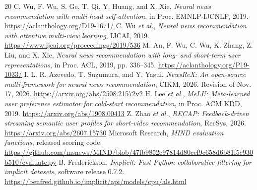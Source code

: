 \documentclass[11pt,onecolumn,conference,letterpaper]{IEEEtran}
\begin{document}
\begin{thebibliography}{20}
 C. Wu, F. Wu, S. Ge, T. Qi, Y. Huang, and X. Xie, \emph{Neural news recommendation with multi-head self-attention}, in Proc. EMNLP-IJCNLP, 2019. \url{https://aclanthology.org/D19-1671/}
 C. Wu \emph{et al.}, \emph{Neural news recommendation with attentive multi-view learning}, IJCAI, 2019. \url{https://www.ijcai.org/proceedings/2019/536}
 M. An, F. Wu, C. Wu, K. Zhang, Z. Liu, and X. Xie, \emph{Neural news recommendation with long- and short-term user representations}, in Proc. ACL, 2019, pp. 336--345. \url{https://aclanthology.org/P19-1033/}
 I. L. R. Azevedo, T. Suzumura, and Y. Yasui, \emph{NewsReX: An open-source multi-framework for neural news recommendation}, CIKM, 2026. Revision of Nov. 17, 2026. \url{https://arxiv.org/abs/2508.21572v2}
 H. Lee \emph{et al.}, \emph{MeLU: Meta-learned user preference estimator for cold-start recommendation}, in Proc. ACM KDD, 2019. \url{https://arxiv.org/abs/1908.00413}
 Z. Zhao \emph{et al.}, \emph{RECAP: Feedback-driven streaming semantic user profiles for short-video recommendation}, RecSys, 2026. \url{https://arxiv.org/abs/2607.15730}
 Microsoft Research, \emph{MIND evaluation functions}, released scoring code. \url{https://github.com/msnews/MIND/blob/47fb9852c97814d80ccf9c658d6b81f5c930b510/evaluate.py}
 B. Frederickson, \emph{Implicit: Fast Python collaborative filtering for implicit datasets}, software release 0.7.2. \url{https://benfred.github.io/implicit/api/models/cpu/als.html}
\end{thebibliography}
\end{document}

